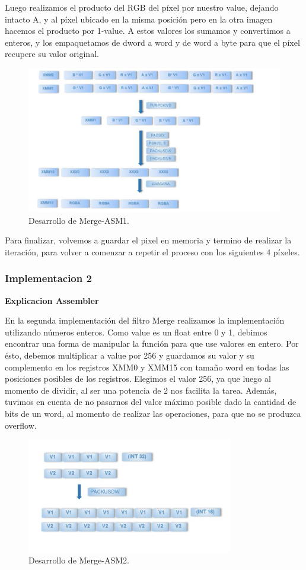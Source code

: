 Luego realizamos el producto del RGB del píxel por nuestro value, dejando intacto A, y al píxel ubicado en la misma posición pero en la otra imagen hacemos el producto por 1-value. A estos valores los sumamos y convertimos a enteros, y los empaquetamos de dword a word y de word a byte para que el píxel recupere su valor original.

\begin{figure}[ht!]
\centering
\includegraphics[width=120mm]{imagenes/merge/merge1-3.png}
\caption{Desarrollo de Merge-ASM1.}
\end{figure}

Para finalizar, volvemos a guardar el pixel en memoria y termino de realizar la iteración, para volver a comenzar a repetir el proceso con los siguientes 4 píxeles.

\subsubsection{Implementacion 2}

\textbf{Explicacion Assembler}

En la segunda implementación del filtro Merge realizamos la implementación utilizando números enteros. Como value es un float entre 0 y 1, debimos encontrar una forma de manipular la función para que use valores en entero. Por ésto, debemos multiplicar a value por 256 y guardamos su valor y su complemento en los registros XMM0 y XMM15 con tamaño word en todas las posiciones posibles de los registros. Elegimos el valor 256, ya que luego al momento de dividir, al ser una potencia de 2 nos facilita la tarea. Además, tuvimos en cuenta de no pasarnos del valor máximo posible dado la cantidad de bits de un word, al momento de realizar las operaciones, para que no se produzca overflow.

\begin{figure}[ht!]
\centering
\includegraphics[width=90mm]{imagenes/merge/merge2-1.png}
\caption{Desarrollo de Merge-ASM2.}
\end{figure}

